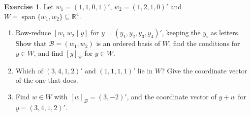 \documentclass[12pt]{article}
\newcommand{\R}{\mathbb R}
\DeclareMathOperator{\Span}{span}
\theoremstyle{definition}
\newtheorem{exercise}{Exercise}
\begin{document}
\begin{exercise}\label{r3-dr-coordinates}
Let \(w_1=(1,1,0,1)'\), \(w_2=(1,2,1,0)'\) and \(W=\Span\{w_1,w_2\}\subseteq\R^4\).
\begin{enumerate}
\item Row-reduce \([w_1\ w_2\mid y]\) for \(y=(y_1,y_2,y_3,y_4)'\), keeping the \(y_i\) as letters. Show that
\(\mathcal B=(w_1,w_2)\) is an ordered basis of \(W\), find the conditions for \(y\in W\), and find
\([y]_{\mathcal B}\) for \(y\in W\).
\item Which of \((3,4,1,2)'\) and \((1,1,1,1)'\) lie in \(W\)? Give the coordinate vector of the one
that does.
\item Find \(w\in W\) with \([w]_{\mathcal B}=(3,-2)'\), and the coordinate vector of \(y+w\) for
\(y=(3,4,1,2)'\).
\end{enumerate}
\end{exercise}
\end{document}
